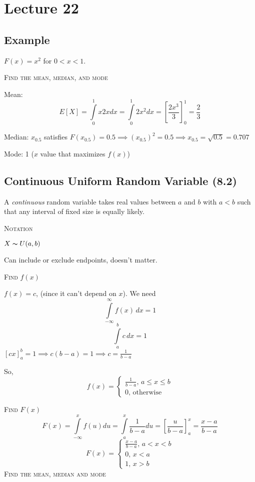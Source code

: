 \section{Lecture 22}
\subsection{Example}
$ F(x)=x^2 $ for $ 0<x<1 $.

\textsc{Find the mean, median, and mode}

Mean:
\[ E[X]=\int\limits_{0}^{1} x2x d{x} =\int\limits_{0}^{1} 2x^2 d{x}=
\left[\frac{2x^3}{3}\right]_0^1=\frac{2}{3} \]

Median:
$ x_{0.5} $ satisfies $ F(x_{0.5})=0.5 \implies (x_{0.5})^2=0.5\implies x_{0.5}=
\sqrt{0.5}=0.707$

Mode: 1 ($ x $ value that maximizes $ f(x) $)

\subsection{Continuous Uniform Random Variable (8.2)}
A \emph{continuous} random variable takes real values between $ a $ and
$ b $ with $ a<b $ such that any interval of fixed size is equally likely.

\textsc{Notation}

$ X \thicksim U(a,b) $
\begin{remark}
    Can include or exclude endpoints, doesn't matter.
\end{remark}

\textsc{Find $f(x)$}

$ f(x)=c $, (since it can't depend on $ x $). We need
\[ \int\limits_{-\infty}^{\infty} f(x)\,d{x} =1 \]
\[ \int\limits_{a}^{b} c\,d{x} =1 \]
$ \left[cx\right]_a^b=1\implies c(b-a)=1\implies c=\frac{1}{b-a} $

So,
\[ f(x)=\begin{cases}
    \frac{1}{b-a},\, a\le x\le b\\
    0,\, \text{otherwise}
\end{cases} \]

\textsc{Find $ F(x) $}
\[ F(x)=\int\limits_{-\infty}^{x} f(u) d{u}
=\int\limits_{a}^{x} \frac{1}{b-a} d{u}
=\left[\frac{u}{b-a}\right]_a^x=\frac{x-a}{b-a} \]
\[ F(x)=\begin{cases}
    \frac{x-a}{b-a},\, a<x<b\\
    0,\,x<a\\
    1,\,x>b
\end{cases} \]
\textsc{Find the mean, median and mode}

